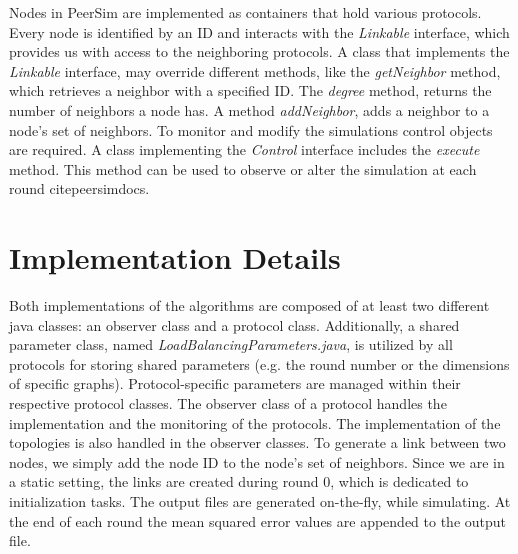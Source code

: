 Nodes in PeerSim are implemented as containers that hold various protocols. Every node is identified by an ID and interacts with the \textit{Linkable} interface, which provides us with access to the neighboring protocols. A class that implements the \textit{Linkable} interface, may override different methods, like the \textit{getNeighbor} method, which retrieves a neighbor with a specified ID. The \textit{degree} method, returns the number of neighbors a node has. A method \textit{addNeighbor}, adds a neighbor to a node's set of neighbors. To monitor and modify the simulations control objects are required. A class implementing the \textit{Control} interface includes the \textit{execute} method. This method can be used to observe or alter the simulation at each round cite{peersimdocs}.

\section{Implementation Details}
Both implementations of the algorithms are composed of at least two different java classes: an observer class and a protocol class. Additionally, a shared parameter class, named \textit{LoadBalancingParameters.java}, is utilized by all protocols for storing shared parameters (e.g. the round number or the dimensions of specific graphs). Protocol-specific parameters are managed within their respective protocol classes. The observer class of a protocol handles the implementation and the monitoring of the protocols. The implementation of the topologies is also handled in the observer classes. To generate a link between two nodes, we simply add the node ID to the node's set of neighbors. Since we are in a static setting, the links are created during round 0, which is dedicated to initialization tasks. The output files are generated on-the-fly, while simulating. At the end of each round the mean squared error values are appended to the output file.
